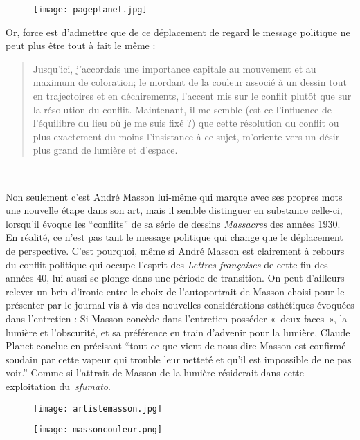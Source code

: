 \begin{figure}[H]
   \centering
   \texttt{[image: pageplanet.jpg]}
	\caption{\cite{entretienmasson}}\label{fig:Planet}
\end{figure}


Or, force est d’admettre que de ce déplacement de regard le message politique ne peut plus être tout à fait le même : 
\begin{quote}
  Jusqu’ici, j’accordais une importance capitale au mouvement et au maximum de coloration; le mordant de la couleur associé à un dessin tout en trajectoires et en déchirements, l’accent mis sur le conflit plutôt que sur la résolution du conflit. Maintenant, il me semble (est-ce l’influence de l’équilibre du lieu où je me suis fixé ?) que cette résolution du conflit ou plus exactement du moins l’insistance à ce sujet, m’oriente vers un désir plus grand de lumière et d’espace.  
\end{quote}
 

	Non seulement c’est André Masson lui-même qui marque avec ses propres mots une nouvelle étape dans son art, mais il semble distinguer en substance celle-ci, lorsqu’il évoque les \enquote{conflits} de sa série de dessins \emph{Massacres} des années 1930. En réalité, ce n’est pas tant le message politique qui change que le déplacement de perspective. C’est pourquoi, même si André Masson est clairement à rebours du conflit politique qui occupe l’esprit des \emph{Lettres françaises} de cette fin des années 40, lui aussi se plonge dans une période de transition. On peut d’ailleurs relever un brin d’ironie entre le choix de l’autoportrait de Masson choisi pour le présenter par le journal vis-à-vis des nouvelles considérations esthétiques évoquées dans l’entretien : Si Masson concède dans l’entretien posséder « deux faces », la lumière et l’obscurité, et sa préférence en train d’advenir pour la lumière, Claude Planet conclue en précisant \enquote{tout ce que vient de nous dire Masson est confirmé soudain par cette vapeur qui trouble leur netteté et qu’il est impossible de ne pas voir.} Comme si l’attrait de Masson de la lumière résiderait dans cette exploitation du \emph{sfumato}. 


\begin{figure}[H]
   \centering
   \texttt{[image: artistemasson.jpg]}
	\caption{\cite{entretienmasson}}\label{fig:Autoportrait}
\end{figure}

\begin{figure}[H]
   \centering
   \texttt{[image: massoncouleur.png]}
	\caption{\cite{entretienmasson}}\label{fig:Autoportraitcouleur}
\end{figure}


